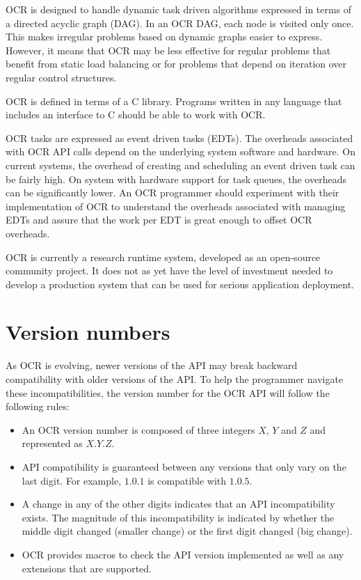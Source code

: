 OCR is designed to handle dynamic task driven algorithms expressed in
terms of a directed acyclic graph (DAG). In an OCR DAG, each node is
visited only once. This makes irregular problems based on dynamic
graphs easier to express. However, it means that OCR may be less
effective for regular problems that benefit from static load balancing
or for problems that depend on iteration over regular control
structures.

OCR is defined in terms of a C library. Programs written in any
language that includes an interface to C should be able to work with
OCR.

OCR tasks are expressed as event driven tasks (EDTs).
The overheads associated with OCR API calls depend on the underlying
system software and hardware. On current systems, the overhead of
creating and scheduling an event driven task can be fairly high.
On system with hardware support for task queues, the
overheads can be significantly lower. An OCR programmer should experiment with their
implementation of OCR to understand the overheads associated with managing EDTs and
assure that the work per EDT is great enough to offset OCR overheads.

OCR is currently a research runtime system, developed as an
open-source community project. It does not as yet have the level of
investment needed to develop a production system that can be used for
serious application deployment.
\section{Version numbers}
As OCR is evolving, newer versions of the API may break
backward compatibility with older versions of the API. To help the
programmer navigate these incompatibilities, the version number for
the OCR API will follow the following rules:
\begin{itemize}
\item{An OCR version number is composed of three integers $X$, $Y$ and
  $Z$ and represented as $X.Y.Z$.}
\item{API compatibility is guaranteed between any versions that only
  vary on the last digit. For example, $1.0.1$ is compatible with
  $1.0.5$.}
\item{A change in any of the other digits indicates that an API
  incompatibility exists. The magnitude of this incompatibility is
  indicated by whether the middle digit changed (smaller change) or
  the first digit changed (big change).}
\item{OCR provides macros to check the API version implemented as
  well as any extensions that are supported.}
\end{itemize}
